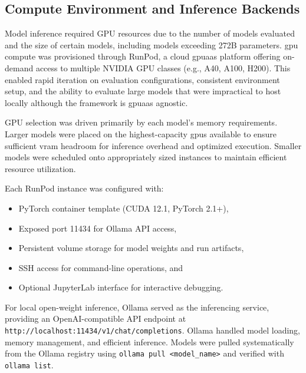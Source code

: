 \subsection{Compute Environment and Inference Backends}
\label{subsec:ch3_compute_backends}

Model inference required GPU resources due to the number of models evaluated and the size of certain models, including models exceeding 272B parameters. \ac{gpu} compute was provisioned through RunPod, a cloud \ac{gpuaas} platform offering on-demand access to multiple NVIDIA GPU classes (e.g., A40, A100, H200). This enabled rapid iteration on evaluation configurations, consistent environment setup, and the ability to evaluate large models that were impractical to host locally although the framework is \ac{gpuaas} agnostic.

GPU selection was driven primarily by each model's memory requirements. Larger models were placed on the highest-capacity \acp{gpu} available to ensure sufficient \ac{vram} headroom for inference overhead and optimized execution. Smaller models were scheduled onto appropriately sized instances to maintain efficient resource utilization.

Each RunPod instance was configured with:
\begin{itemize}
    \item PyTorch container template (CUDA 12.1, PyTorch 2.1+),
    \item Exposed port 11434 for Ollama API access,
    \item Persistent volume storage for model weights and run artifacts,
    \item SSH access for command-line operations, and
    \item Optional JupyterLab interface for interactive debugging.
\end{itemize}




For local open-weight inference, Ollama served as the inferencing service, providing an OpenAI-compatible API endpoint at \texttt{http://localhost:11434/v1/chat/completions}. Ollama handled model loading, memory management, and efficient inference. Models were pulled systematically from the Ollama registry using \texttt{ollama pull <model\_name>} and verified with \texttt{ollama list}.

